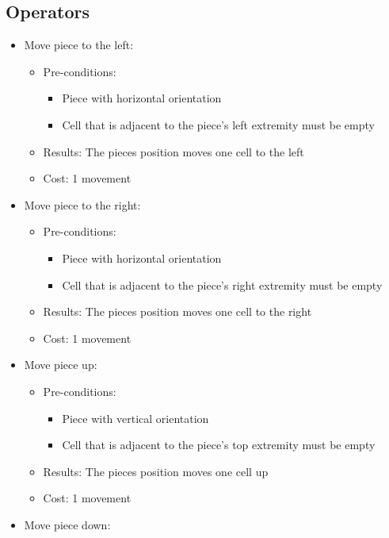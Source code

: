 \documentclass[conference]{IEEEtran}
\begin{document}
\subsection{Operators}
\begin{itemize}
    \item Move piece to the left:
    \begin{itemize}
        \item Pre-conditions:
        \begin{itemize}
            \item Piece with horizontal orientation
            \item Cell that is adjacent to the piece's left extremity must be empty
        \end{itemize}
        \item Results: The pieces position moves one cell to the left
        \item Cost: 1 movement
    \end{itemize}
    \item Move piece to the right:
    \begin{itemize}
        \item Pre-conditions:
        \begin{itemize}
            \item Piece with horizontal orientation
            \item Cell that is adjacent to the piece's right extremity must be empty
        \end{itemize}
        \item Results: The pieces position moves one cell to the right
        \item Cost: 1 movement
    \end{itemize}
    \item Move piece up:
        \begin{itemize}
        \item Pre-conditions:
        \begin{itemize}
            \item Piece with vertical orientation
            \item Cell that is adjacent to the piece's top extremity must be empty
        \end{itemize}
        \item Results: The pieces position moves one cell up
        \item Cost: 1 movement
    \end{itemize}
    \item Move piece down:

\end{itemize}
\end{document}
